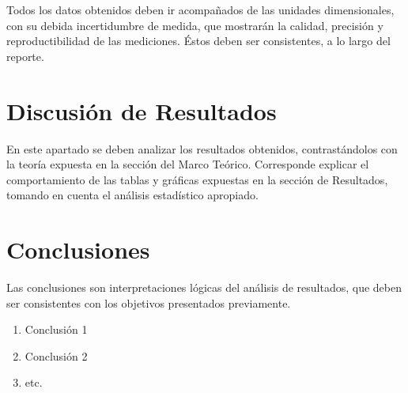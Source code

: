 \documentclass[osajnl,twocolumn,showpacs,superscriptaddress,10pt]{revtex4-1}
\begin{document}
    Todos los datos obtenidos deben ir acompañados de las unidades dimensionales, con su debida incertidumbre de medida, que mostrarán la calidad, precisión y reproductibilidad de las mediciones. Éstos deben ser consistentes, a lo largo del reporte.\\


\section{Discusión de Resultados}

    En este apartado se deben analizar los resultados obtenidos, contrastándolos con la teoría expuesta en la sección del Marco Teórico. Corresponde explicar el comportamiento de las tablas y gráficas expuestas en la sección de Resultados, tomando en cuenta el análisis estadístico apropiado.\\


\section{Conclusiones}

    Las conclusiones son interpretaciones lógicas del análisis de resultados, que deben ser consistentes con los objetivos presentados previamente.\\

\begin{enumerate}
    \item Conclusión 1
    \item Conclusión 2
    \item etc.
\end{enumerate}


\end{document}

